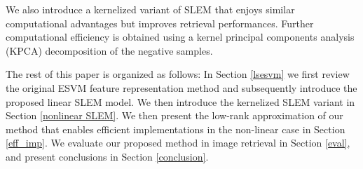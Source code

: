 We also introduce a kernelized variant of SLEM that enjoys similar computational advantages but improves retrieval performances. Further computational efficiency is obtained using a kernel principal components analysis (KPCA) decomposition of the negative samples.

The rest of this paper is organized as follows:
In Section \ref{lsesvm} we first review the original ESVM feature representation method and subsequently introduce the proposed linear SLEM model. We then introduce the kernelized SLEM variant in Section \ref{nonlinear SLEM}. We then present the low-rank approximation of our method that enables efficient implementations in the non-linear case in Section \ref{eff_imp}. We evaluate our proposed method in image retrieval in Section \ref{eval}, and present conclusions in Section \ref{conclusion}.










